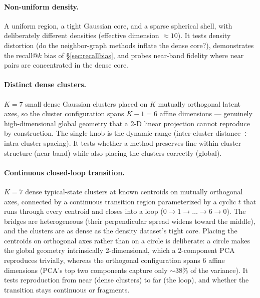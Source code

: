 \documentclass[11pt]{article}
\begin{document}
\paragraph{Non-uniform density.} A uniform region, a tight Gaussian core,
and a sparse spherical shell, with deliberately different densities
(effective dimension ${\approx}10$). It tests density distortion (do the
neighbor-graph methods inflate the dense core?), demonstrates the
recall@$k$ bias of \S\ref{sec:recallbias}, and probes near-band fidelity
where near pairs are concentrated in the dense core.

\paragraph{Distinct dense clusters.} $K{=}7$ small dense Gaussian clusters
placed on $K$ mutually orthogonal latent axes, so the cluster configuration
spans $K{-}1 = 6$ affine dimensions --- genuinely high-dimensional global
geometry that a 2-D linear projection cannot reproduce by construction. The
single knob is the dynamic range (inter-cluster distance $\div$
intra-cluster spacing). It tests whether a method preserves fine
within-cluster structure (near band) while also placing the clusters
correctly (global).

\paragraph{Continuous closed-loop transition.} $K{=}7$ dense typical-state
clusters at known centroids on mutually orthogonal axes, connected by a
continuous transition region parameterized by a cyclic $t$ that runs through
every centroid and closes into a loop ($0{\to}1{\to}\dots{\to}6{\to}0$). The
bridges are heterogeneous (their perpendicular spread widens toward the
middle), and the clusters are as dense as the density dataset's tight core.
Placing the centroids on orthogonal axes rather than on a circle is
deliberate: a circle makes the global geometry intrinsically 2-dimensional,
which a 2-component PCA reproduces trivially, whereas the orthogonal
configuration spans 6 affine dimensions (PCA's top two components capture
only ${\sim}38\%$ of the variance). It tests reproduction from near (dense
clusters) to far (the loop), and whether the transition stays continuous or
fragments.
\end{document}
